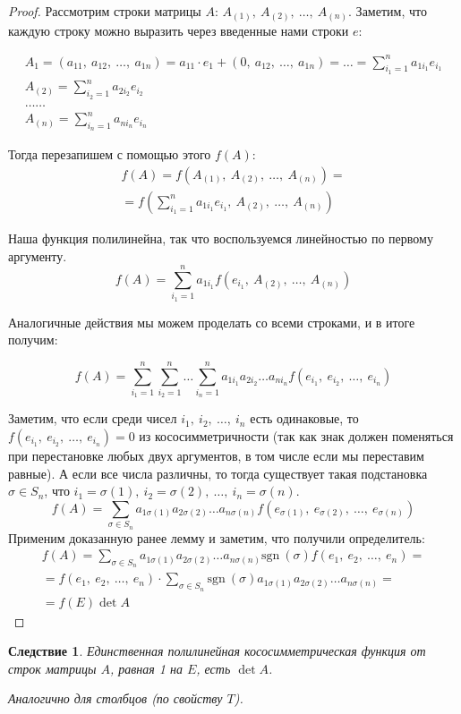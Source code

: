 \documentclass[a4paper,12pt]{article}
\newcommand{\sgn}{\mathrm{sgn\:}}
\newtheorem*{consequence}{Следствие}
\begin{document}
	\begin{proof}
		Рассмотрим строки матрицы $A$: $A_{(1)},\ A_{(2)},\ \ldots,\ A_{(n)}$. Заметим, что каждую строку можно выразить через введенные нами строки $e$:
		
		\begin{gather*}
		A_{1} = (a_{11},\ a_{12},\ \ldots,\ a_{1n}) = a_{11}\cdot e_1 + (0,\ a_{12},\ \ldots,\ a_{1n}) = \ldots = \sum_{i_1 = 1}^{n}a_{1i_1}e_{i_1} \\
		A_{(2)} = \sum_{i_2 = 1}^{n} a_{2i_2} e_{i_2} \\
		\ldots\ldots\\
		A_{(n)} = \sum_{i_n = 1}^{n} a_{ni_n} e_{i_n}
		\end{gather*}
		
		Тогда перезапишем с помощью этого $f(A)$:
		\begin{gather*}
		f(A) = f(A_{(1)},\ A_{(2)},\ \ldots,\ A_{(n)}) = \\
		= f(\sum_{i_1 = 1}^{n}a_{1i_1}e_{i_1},\  A_{(2)},\ \ldots,\ A_{(n)})
		\end{gather*}
		
		Наша функция полилинейна, так что воспользуемся линейностью по первому аргументу.
		$$
		f(A) = \sum_{i_1 = 1}^{n}a_{1i_1} f(e_{i_1},\ A_{(2)},\ \ldots,\ A_{(n)})
		$$
		
		Аналогичные действия мы можем проделать со всеми строками, и в итоге получим:
		
		$$
		f(A) = \sum_{i_1 = 1}^{n} \sum_{i_2 = 1}^{n} \ldots \sum_{i_n = 1}^{n}a_{1i_1}a_{2i_2}\ldots a_{ni_n} f(e_{i_1},\ e_{i_2},\ \ldots,\ e_{i_n})
		$$
		
		Заметим, что если среди чисел $i_1,\ i_2,\ \ldots,\ i_n$ есть одинаковые, то $f(e_{i_1},\ e_{i_2},\ \ldots,\ e_{i_n}) = 0$ из кососимметричности (так как знак должен поменяться при перестановке любых двух аргументов, в том числе если мы переставим равные). А если все числа различны, то тогда существует такая подстановка $\sigma \in S_n$, что $i_1 = \sigma(1),\ i_2 = \sigma(2),\ \ldots,\ i_n = \sigma(n)$.
		$$
		f(A) = \sum_{\sigma \in S_n}a_{1\sigma(1)}a_{2\sigma(2)}\ldots a_{n\sigma(n)} f(e_{\sigma(1)},\ e_{\sigma(2)},\ \ldots,\ e_{\sigma(n)})
		$$
		Применим доказанную ранее лемму и заметим, что получили определитель:
		\begin{gather*}
		f(A) = \sum_{\sigma \in S_n}a_{1\sigma(1)}a_{2\sigma(2)}\ldots a_{n\sigma(n)} \sgn(\sigma) f(e_1,\ e_2,\ \ldots,\ e_n) = \\
		= f(e_1,\ e_2,\ \ldots,\ e_n) \cdot \sum_{\sigma \in S_n} \sgn(\sigma)a_{1\sigma(1)}a_{2\sigma(2)}\ldots a_{n\sigma(n)} = \\
		= f(E) \det A
		\end{gather*}
	\end{proof}
	\begin{consequence}
		Единственная полилинейная кососимметрическая функция от строк матрицы $A$, равная 1 на $E$, есть $\det A$.
		
		Аналогично для столбцов (по свойству $T$).
	\end{consequence}
	
\end{document}
